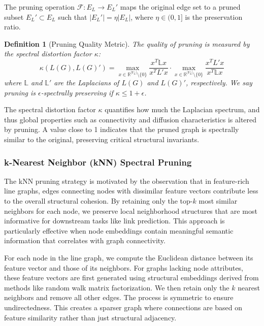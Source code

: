 \documentclass[pdflatex,sn-mathphys-num]{sn-jnl}%
\theoremstyle{thmstyleone}%
\theoremstyle{thmstyletwo}%
\theoremstyle{thmstylethree}%
\newtheorem{definition}{Definition}%
\theoremstyle{plain} %
\theoremstyle{definition} %
\theoremstyle{remark} %
\theoremstyle{plain} %
\begin{document}
The pruning operation $\mathcal{F}: E_L \to E_L'$ maps the original edge set to a pruned subset $E_L' \subset E_L$ such that $|E_L'| = \eta |E_L|$, where $\eta \in (0,1]$ is the preservation ratio.

\begin{definition}[Pruning Quality Metric]
The quality of pruning is measured by the spectral distortion factor $\kappa$:
\begin{equation}
 \kappa(L(G), L(G)') = \max_{x \in \mathbb{R}^{|V_L|} \setminus \{0\}} \frac{x^T \mathbb{L} x}{x^T L' x} \cdot \max_{x \in \mathbb{R}^{|V_L|} \setminus \{0\}} \frac{x^T L' x}{x^T \mathbb{L} x}
\end{equation}
where $\mathbb{L}$ and $\mathbb{L}'$ are the Laplacians of $L(G)$ and $L(G)'$, respectively. We say pruning is $\epsilon$-spectrally preserving if $\kappa \leq 1 + \epsilon$.
\end{definition}

The spectral distortion factor $\kappa$ quantifies how much the Laplacian spectrum, and thus global properties such as connectivity and diffusion characteristics is altered by pruning. 
A value close to 1 indicates that the pruned graph is spectrally similar to the original, preserving critical structural invariants.

\subsubsection{k-Nearest Neighbor (kNN) Spectral Pruning}

 
The kNN pruning strategy is motivated by the observation that in feature-rich line graphs, edges connecting nodes with dissimilar feature vectors contribute less to the overall structural cohesion. 
By retaining only the top-$k$ most similar neighbors for each node, we preserve local neighborhood structures that are most informative for downstream tasks like link prediction. 
This approach is particularly effective when node embeddings contain meaningful semantic information that correlates with graph connectivity.


For each node in the line graph, we compute the Euclidean distance between its feature vector and those of its neighbors. 
For graphs lacking node attributes, these feature vectors are first generated using structural embeddings derived from methods like random walk matrix factorization.
We then retain only the $k$ nearest neighbors and remove all other edges. 
The process is symmetric to ensure undirectedness. 
This creates a sparser graph where connections are based on feature similarity rather than just structural adjacency.
\end{document}
